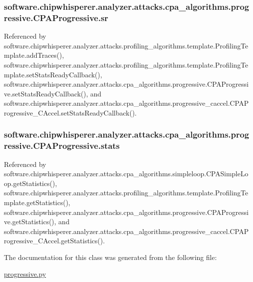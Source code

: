 \subsubsection[{sr}]{\setlength{\rightskip}{0pt plus 5cm}software.\+chipwhisperer.\+analyzer.\+attacks.\+cpa\+\_\+algorithms.\+progressive.\+C\+P\+A\+Progressive.\+sr}\label{classsoftware_1_1chipwhisperer_1_1analyzer_1_1attacks_1_1cpa__algorithms_1_1progressive_1_1CPAProgressive_a106dc20059379dba40e4ef321ae35fd4}


Referenced by software.\+chipwhisperer.\+analyzer.\+attacks.\+profiling\+\_\+algorithms.\+template.\+Profiling\+Template.\+add\+Traces(), software.\+chipwhisperer.\+analyzer.\+attacks.\+profiling\+\_\+algorithms.\+template.\+Profiling\+Template.\+set\+Stats\+Ready\+Callback(), software.\+chipwhisperer.\+analyzer.\+attacks.\+cpa\+\_\+algorithms.\+progressive.\+C\+P\+A\+Progressive.\+set\+Stats\+Ready\+Callback(), and software.\+chipwhisperer.\+analyzer.\+attacks.\+cpa\+\_\+algorithms.\+progressive\+\_\+caccel.\+C\+P\+A\+Progressive\+\_\+\+C\+Accel.\+set\+Stats\+Ready\+Callback().

\hypertarget{classsoftware_1_1chipwhisperer_1_1analyzer_1_1attacks_1_1cpa__algorithms_1_1progressive_1_1CPAProgressive_a202eee7d3192dae10664aa20cef84667}{}
\subsubsection[{stats}]{\setlength{\rightskip}{0pt plus 5cm}software.\+chipwhisperer.\+analyzer.\+attacks.\+cpa\+\_\+algorithms.\+progressive.\+C\+P\+A\+Progressive.\+stats}\label{classsoftware_1_1chipwhisperer_1_1analyzer_1_1attacks_1_1cpa__algorithms_1_1progressive_1_1CPAProgressive_a202eee7d3192dae10664aa20cef84667}


Referenced by software.\+chipwhisperer.\+analyzer.\+attacks.\+cpa\+\_\+algorithms.\+simpleloop.\+C\+P\+A\+Simple\+Loop.\+get\+Statistics(), software.\+chipwhisperer.\+analyzer.\+attacks.\+profiling\+\_\+algorithms.\+template.\+Profiling\+Template.\+get\+Statistics(), software.\+chipwhisperer.\+analyzer.\+attacks.\+cpa\+\_\+algorithms.\+progressive.\+C\+P\+A\+Progressive.\+get\+Statistics(), and software.\+chipwhisperer.\+analyzer.\+attacks.\+cpa\+\_\+algorithms.\+progressive\+\_\+caccel.\+C\+P\+A\+Progressive\+\_\+\+C\+Accel.\+get\+Statistics().



The documentation for this class was generated from the following file\+:\begin{DoxyCompactItemize}
\item 
\hyperlink{progressive_8py}{progressive.\+py}\end{DoxyCompactItemize}
